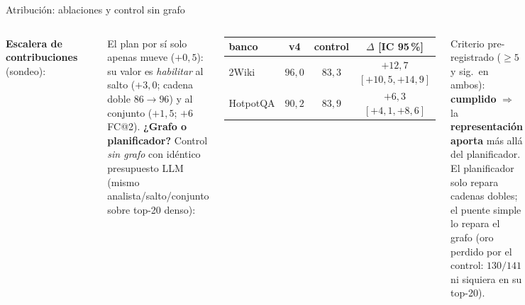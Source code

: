 \documentclass[aspectratio=169,10pt]{beamer}
\newcommand{\bien}[1]{\textcolor{verde}{\textbf{#1}}}
\begin{document}
\begin{frame}{Atribución: ablaciones y control sin grafo}
\begin{columns}[T]
\textbf{Escalera de contribuciones} (sondeo):
\begin{center}
\end{center}
\footnotesize El plan por sí solo apenas mueve ($+0{,}5$): su valor es
\emph{habilitar} al salto ($+3{,}0$; cadena doble $86\to96$) y al conjunto
($+1{,}5$; $+6$ FC@2).
\textbf{¿Grafo o planificador?} Control \emph{sin grafo} con idéntico
presupuesto LLM (mismo analista/salto/conjunto sobre top-20 denso):
\begin{center}\small
\begin{tabular}{lccc}
\toprule
banco & v4 & control & $\Delta$ [IC 95\,\%]\\
\midrule
2Wiki & $96{,}0$ & $83{,}3$ & \bien{$+12{,}7$} $[+10{,}5,+14{,}9]$\\
HotpotQA & $90{,}2$ & $83{,}9$ & \bien{$+6{,}3$} $[+4{,}1,+8{,}6]$\\
\bottomrule
\end{tabular}
\end{center}
\footnotesize Criterio pre-registrado ($\ge 5$ y sig.\ en ambos): \bien{cumplido}
$\Rightarrow$ la \textbf{representación aporta} más allá del planificador.
El planificador solo repara cadenas dobles; el puente simple lo repara el grafo
(oro perdido por el control: $130/141$ ni siquiera en su top-20).
\end{columns}
\end{frame}
\end{document}
